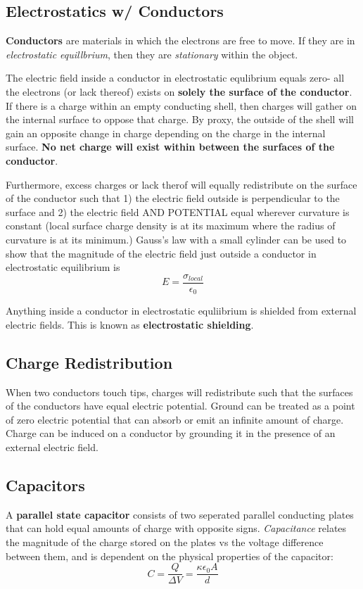 \documentclass{article}
\begin{document}
\subsection{Electrostatics w/ Conductors}

\textbf{Conductors} are materials in which the electrons are free to move.
If they are in \textit{electrostatic equillbrium}, then they are \textit{stationary} within the object.

The electric field inside a conductor in electrostatic equlibrium equals zero- all the electrons (or lack thereof) exists on \textbf{solely the surface of the conductor}.
If there is a charge within an empty conducting shell, then charges will gather on the internal surface to oppose that charge.
By proxy, the outside of the shell will gain an opposite change in charge depending on the charge in the internal surface.
\textbf{No net charge will exist within between the surfaces of the conductor}.

Furthermore, excess charges or lack therof will equally redistribute on the surface of the conductor such that 1) the electric field outside is perpendicular to the surface and 2) the electric field AND POTENTIAL equal wherever curvature is constant (local surface charge density is at its maximum where the radius of curvature is at its minimum.)
Gauss's law with a small cylinder can be used to show that the magnitude of the electric field just outside a conductor in electrostatic equilibrium is
\[E = \frac{\sigma_{local}}{\epsilon_0}\]

Anything inside a conductor in electrostatic equliibrium is shielded from external electric fields. This is known as \textbf{electrostatic shielding}.

\subsection{Charge Redistribution}
When two conductors touch tips, charges will redistribute such that the surfaces of the conductors have equal electric potential.
Ground can be treated as a point of zero electric potential that can absorb or emit an infinite amount of charge.
Charge can be induced on a conductor by grounding it in the presence of an external electric field.

\subsection{Capacitors}
A \textbf{parallel state capacitor} consists of two seperated parallel conducting plates that can hold equal amounts of charge with opposite signs.
\textit{Capacitance} relates the magnitude of the charge stored on the plates vs the voltage difference between them, and is dependent on the physical properties of the capacitor:
\[C = \frac{Q}{\Delta V} = \frac{\kappa \epsilon_0 A}{d}\]
\end{document}
